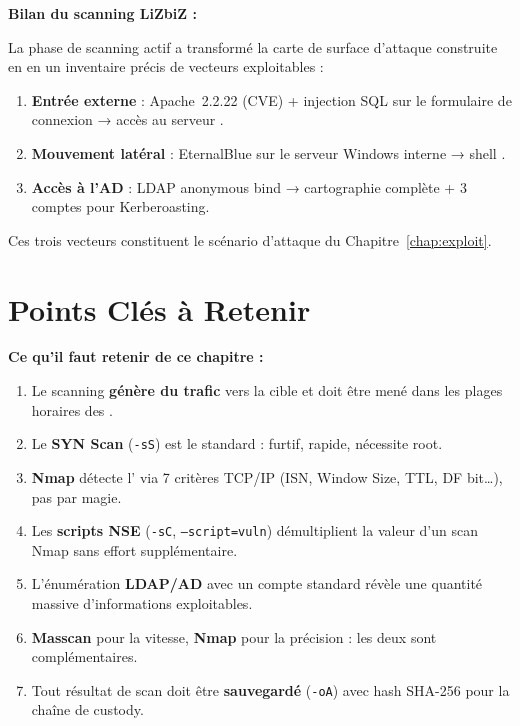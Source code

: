 \begin{boxlizbiz}
\textbf{Bilan du scanning LiZbiZ :}

La phase de scanning actif a transformé la carte de surface d'attaque
construite en  en un inventaire précis de vecteurs exploitables :
\begin{enumerate}
    \item \textbf{Entrée externe} : Apache~2.2.22 (CVE) + injection SQL
          sur le formulaire de connexion → accès au serveur .
    \item \textbf{Mouvement latéral} : EternalBlue sur le serveur Windows
          interne → shell .
    \item \textbf{Accès à l'AD} : LDAP anonymous bind → cartographie
          complète + 3 comptes  pour Kerberoasting.
\end{enumerate}
Ces trois vecteurs constituent le scénario d'attaque du
Chapitre~\ref{chap:exploit}.
\end{boxlizbiz}

\section*{Points Clés à Retenir}

\begin{boxinfo}
\textbf{Ce qu'il faut retenir de ce chapitre :}
\begin{enumerate}
    \item Le scanning \textbf{génère du trafic} vers la cible et doit être
          mené dans les plages horaires des .
    \item Le \textbf{SYN Scan} (\texttt{-sS}) est le standard : furtif,
          rapide, nécessite root.
    \item \textbf{Nmap} détecte l' via 7 critères TCP/IP
          (ISN, Window Size, TTL, DF bit…), pas par magie.
    \item Les \textbf{scripts NSE} (\texttt{-sC}, \texttt{--script=vuln})
          démultiplient la valeur d'un scan Nmap sans effort supplémentaire.
    \item L'énumération \textbf{LDAP/AD} avec un compte standard révèle
          une quantité massive d'informations exploitables.
    \item \textbf{Masscan} pour la vitesse, \textbf{Nmap} pour la précision :
          les deux sont complémentaires.
    \item Tout résultat de scan doit être \textbf{sauvegardé} (\texttt{-oA})
          avec hash SHA-256 pour la chaîne de custody.
\end{enumerate}
\end{boxinfo}

